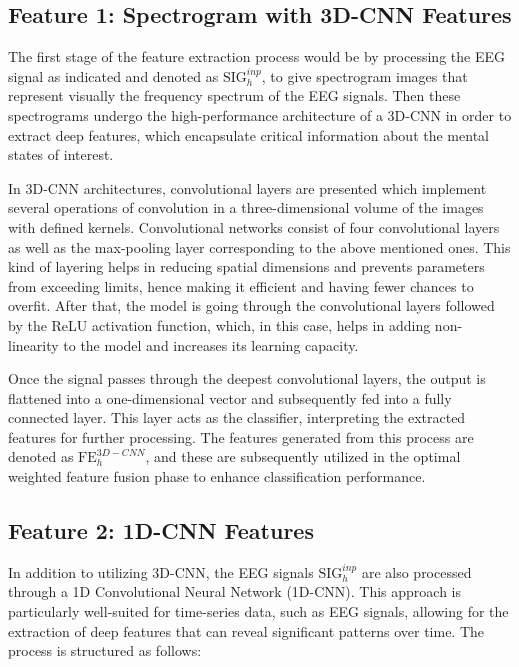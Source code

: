 \documentclass[conference]{IEEEtran}
\begin{document}
\subsection{Feature 1: Spectrogram with 3D-CNN Features}

The first stage of the feature extraction process would be by processing the EEG signal as indicated and denoted as \( \text{SIG}^{inp}_h \), to give spectrogram images that represent visually the frequency spectrum of the EEG signals. Then these spectrograms undergo the high-performance architecture of a 3D-CNN in order to extract deep features, which encapsulate critical information about the mental states of interest.

In 3D-CNN architectures, convolutional layers are presented which implement several operations of convolution in a three-dimensional volume of the images with defined kernels. Convolutional networks consist of four convolutional layers as well as the max-pooling layer corresponding to the above mentioned ones. This kind of layering helps in reducing spatial dimensions and prevents parameters from exceeding limits, hence making it efficient and having fewer chances to overfit. After that, the model is going through the convolutional layers followed by the ReLU activation function, which, in this case, helps in adding non-linearity to the model and increases its learning capacity.

Once the signal passes through the deepest convolutional layers, the output is flattened into a one-dimensional vector and subsequently fed into a fully connected layer. This layer acts as the classifier, interpreting the extracted features for further processing. The features generated from this process are denoted as \( \text{FE}^{3D-CNN}_h \), and these are subsequently utilized in the optimal weighted feature fusion phase to enhance classification performance.

\subsection{Feature 2: 1D-CNN Features}

In addition to utilizing 3D-CNN, the EEG signals \( \text{SIG}^{inp}_h \) are also processed through a 1D Convolutional Neural Network (1D-CNN). This approach is particularly well-suited for time-series data, such as EEG signals, allowing for the extraction of deep features that can reveal significant patterns over time. The process is structured as follows:
\end{document}
